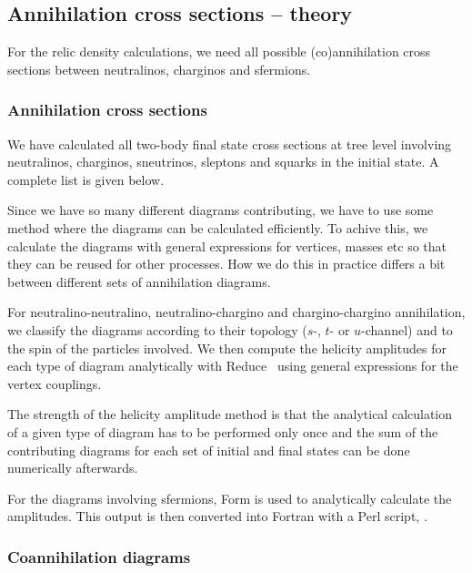 
\subsection{Annihilation cross sections -- theory }

For the relic density calculations, we need all possible
(co)annihilation cross sections between neutralinos, charginos and
sfermions.


\subsubsection{Annihilation cross sections}
\label{sec:AnnCross}

We have calculated all two-body final state cross sections at tree
level  involving neutralinos, charginos, sneutrinos, sleptons and 
squarks in the initial state. A complete list is given below.

Since we have so many different diagrams contributing, we have to use 
some method where the diagrams can be calculated efficiently. To
achive this, we calculate the diagrams with general expressions for
vertices, masses etc so that they can be reused for other
processes. How we do this in practice differs a bit between different
sets of annihilation diagrams.

For neutralino-neutralino, neutralino-chargino and chargino-chargino
annihilation, we 
classify the diagrams according to their topology ($s$-, 
$t$- or $u$-channel) and to the spin of the particles involved.  We 
then compute the helicity amplitudes for each type of diagram 
analytically with {\sc Reduce}~\cite{reduce} using general expressions 
for the vertex couplings.  

The strength of the helicity amplitude method is that the analytical
calculation of a given type of diagram has to be performed only once
and the sum of the contributing diagrams for each set of initial and
final states can be done numerically afterwards.

For the diagrams involving sfermions, {\sc Form}
is used to analytically calculate the amplitudes. This output is then converted
into Fortran with a {\sc Perl} script,  \cite{form2f}.

\subsubsection{Coannihilation diagrams}

